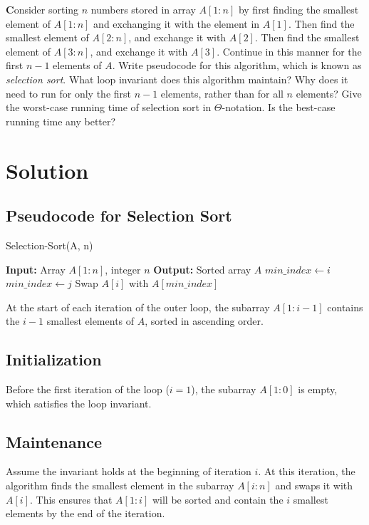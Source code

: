\documentclass{article}
\begin{document}
\textbf Consider sorting $n$ numbers stored in array $A[1:n]$ by first finding the smallest element of $A[1:n]$ and exchanging it with the element in $A[1]$. Then find the smallest element of $A[2:n]$, and exchange it with $A[2]$. Then find the smallest element of $A[3:n]$, and exchange it with $A[3]$. Continue in this manner for the first $n - 1$ elements of $A$. Write pseudocode for this algorithm, which is known as \textit{selection sort}. What loop invariant does this algorithm maintain? Why does it need to run for only the first $n - 1$ elements, rather than for all $n$ elements? Give the worst-case running time of selection sort in $\Theta$-notation. Is the best-case running time any better?

\section*{Solution}

\subsection*{Pseudocode for Selection Sort}

\begin{algorithm}
\caption{Selection-Sort(A, n)}
\begin{algorithmic}[1]
\State \textbf{Input:} Array $A[1:n]$, integer $n$
\State \textbf{Output:} Sorted array $A$
    \State $min\_index \gets i$
            \State $min\_index \gets j$
        \EndIf
    \EndFor
    \State Swap $A[i]$ with $A[min\_index]$
\EndFor
\end{algorithmic}
\end{algorithm}

At the start of each iteration of the outer loop, the subarray $A[1:i-1]$ contains the $i-1$ smallest elements of $A$, sorted in ascending order.

\subsection*{Initialization}
Before the first iteration of the loop ($i = 1$), the subarray $A[1:0]$ is empty, which satisfies the loop invariant.

\subsection*{Maintenance}
Assume the invariant holds at the beginning of iteration $i$. At this iteration, the algorithm finds the smallest element in the subarray $A[i:n]$ and swaps it with $A[i]$. This ensures that $A[1:i]$ will be sorted and contain the $i$ smallest elements by the end of the iteration.
\end{document}
